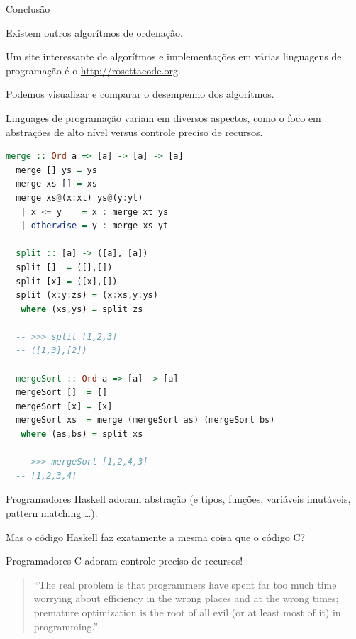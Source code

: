 \documentclass{beamer}
\begin{document}
\begin{frame}{Conclusão}

  Existem outros algorítmos de ordenação.

  Um site interessante de algorítmos e implementações em várias
  linguagens de programação é o \url{http://rosettacode.org}.

  Podemos
  \href{https://www.cs.usfca.edu/~galles/visualization/ComparisonSort.html}{visualizar}
  e comparar o desempenho dos algorítmos.

  Linguages de programação variam em diversos aspectos, como o foco em
  abstrações de alto nível versus controle preciso de recursos.

  \framebreak

  \begin{lstlisting}[style=code,language=Haskell,basicstyle=\ttfamily\tiny]
  merge :: Ord a => [a] -> [a] -> [a]
  merge [] ys = ys
  merge xs [] = xs
  merge xs@(x:xt) ys@(y:yt)
   | x <= y    = x : merge xt ys
   | otherwise = y : merge xs yt

  split :: [a] -> ([a], [a])
  split []  = ([],[])      
  split [x] = ([x],[])
  split (x:y:zs) = (x:xs,y:ys)
   where (xs,ys) = split zs

  -- >>> split [1,2,3]
  -- ([1,3],[2])

  mergeSort :: Ord a => [a] -> [a]
  mergeSort []  = []
  mergeSort [x] = [x]
  mergeSort xs  = merge (mergeSort as) (mergeSort bs)
   where (as,bs) = split xs

  -- >>> mergeSort [1,2,4,3]
  -- [1,2,3,4]
  \end{lstlisting}

  \framebreak

  Programadores \href{http://haskell.org}{Haskell} adoram abstração (e
  tipos, funções, variáveis imutáveis, pattern matching \ldots).
   
  Mas o código Haskell faz exatamente a mesma coisa que o código C?

  Programadores C adoram controle preciso de recursos!

  \framebreak

  \begin{quote}
    ``The real problem is that programmers have spent far too much
    time worrying about efficiency in the wrong places and at the
    wrong times; premature optimization is the root of all evil (or
    at least most of it) in programming.''
  \end{quote}

\end{frame}
\end{document}
